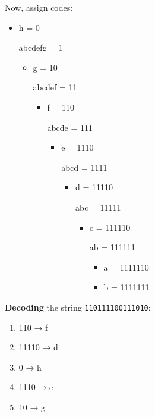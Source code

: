 \documentclass[14pt]{extarticle}
\begin{document}
\newpage
Now, assign codes:
\begin{itemize}
    \item h = 0
    \item [abcdefg] = 1
        \begin{itemize}
            \item g = 10
            \item [abcdef] = 11
                \begin{itemize}
                    \item f = 110
                    \item [abcde] = 111
                        \begin{itemize}
                            \item e = 1110
                            \item [abcd] = 1111
                                \begin{itemize}
                                    \item d = 11110
                                    \item [abc] = 11111
                                        \begin{itemize}
                                            \item c = 111110
                                            \item [ab] = 111111
                                                \begin{itemize}
                                                    \item a = 1111110
                                                    \item b = 1111111
                                                \end{itemize}
                                        \end{itemize}
                                \end{itemize}
                        \end{itemize}
                \end{itemize}
        \end{itemize}
\end{itemize}

\textbf{Decoding} the string \texttt{110111100111010}:

\begin{enumerate}
    \item 110 → f  
    \item 11110 → d  
    \item 0 → h  
    \item 1110 → e  
    \item 10 → g  
\end{enumerate}
\end{document}
